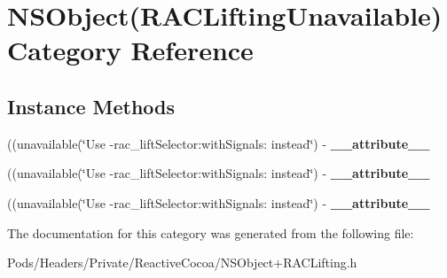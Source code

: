 \hypertarget{category_n_s_object_07_r_a_c_lifting_unavailable_08}{}\section{N\+S\+Object(R\+A\+C\+Lifting\+Unavailable) Category Reference}
\label{category_n_s_object_07_r_a_c_lifting_unavailable_08}
\subsection*{Instance Methods}
\begin{DoxyCompactItemize}
\item 
\mbox{\label{category_n_s_object_07_r_a_c_lifting_unavailable_08_a6f0faf3b0495269b8008a6a23fd3805b}} 
((unavailable(\char`\"{}Use -\/rac\+\_\+lift\+Selector\+:with\+Signals\+: instead\char`\"{}) -\/ {\bfseries \+\_\+\+\_\+attribute\+\_\+\+\_\+}
\item 
\mbox{\label{category_n_s_object_07_r_a_c_lifting_unavailable_08_a6f0faf3b0495269b8008a6a23fd3805b}} 
((unavailable(\char`\"{}Use -\/rac\+\_\+lift\+Selector\+:with\+Signals\+: instead\char`\"{}) -\/ {\bfseries \+\_\+\+\_\+attribute\+\_\+\+\_\+}
\item 
\mbox{\label{category_n_s_object_07_r_a_c_lifting_unavailable_08_a6f0faf3b0495269b8008a6a23fd3805b}} 
((unavailable(\char`\"{}Use -\/rac\+\_\+lift\+Selector\+:with\+Signals\+: instead\char`\"{}) -\/ {\bfseries \+\_\+\+\_\+attribute\+\_\+\+\_\+}
\end{DoxyCompactItemize}


The documentation for this category was generated from the following file\+:\begin{DoxyCompactItemize}
\item 
Pods/\+Headers/\+Private/\+Reactive\+Cocoa/N\+S\+Object+\+R\+A\+C\+Lifting.\+h\end{DoxyCompactItemize}
